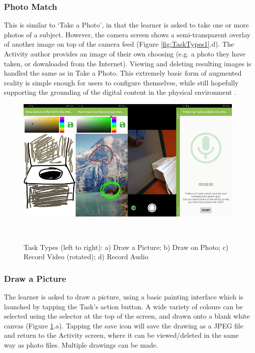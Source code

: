\subsubsection*{Photo Match}
This is similar to `Take a Photo', in that the learner is asked to take one or more photos of a subject. However, the camera screen shows a semi-transparent overlay of another image on top of the camera feed (Figure \ref{fig:TaskTypes1}.d). The Activity author provides an image of their own choosing (e.g. a photo they have taken, or downloaded from the Internet). Viewing and deleting resulting images is handled the same as in Take a Photo. This extremely basic form of augmented reality is simple enough for users to configure themselves, while still hopefully supporting the grounding of the digital content in the physical environment \citep{javornik2019}. 

\begin{figure}
  \centering
  \includegraphics[width=1\columnwidth]{images/chapter05/tasktypes2.png}
  \caption[Task Types (part 2)]{Task Types (left to right): a) Draw a Picture; b) Draw on Photo; c) Record Video (rotated); d) Record Audio}~\label{fig:TaskTypes2}
\end{figure}

\subsubsection*{Draw a Picture}
The learner is asked to draw a picture, using a basic painting interface which is launched by tapping the Task's action button. A wide variety of colours can be selected using the selector at the top of the screen, and drawn onto a blank white canvas (Figure \ref{fig:TaskTypes2}.a). Tapping the save icon will save the drawing as a JPEG file and return to the Activity screen, where it can be viewed/deleted in the same way as photo files. Multiple drawings can be made.

